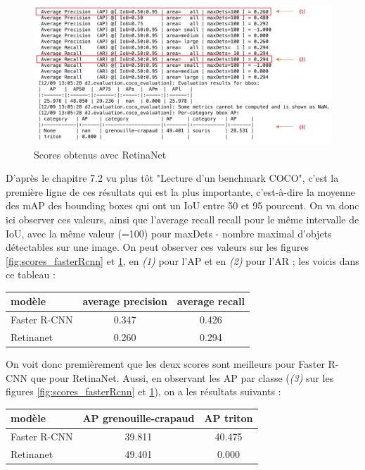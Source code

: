 \begin{figure}[H]
    \centering
    \includegraphics[width=\textwidth]{images/eval_Retinanet_resume_annote.png}
    \caption{Scores obtenus avec RetinaNet}
    \label{fig:scores_retinanet}
\end{figure}

D'après le chapitre 7.2 vu plus tôt "Lecture d'un benchmark COCO", c'est la première ligne de ces résultats qui est la plus importante, c'est-à-dire la moyenne des mAP des bounding boxes qui ont un IoU entre 50 et 95 pourcent. On va donc ici observer ces valeurs, ainsi que l'average recall recall pour le même intervalle de IoU, avec la même valeur (=100) pour maxDets - nombre maximal d'objets détectables sur une image. On peut observer ces valeurs sur les figures \ref{fig:scores_fasterRcnn} et \ref{fig:scores_retinanet}, en \textit{(1)} pour l'AP et en \textit{(2)} pour l'AR ; les voicis dans ce tableau :

\begin{center}
   \begin{tabular}{ | l || c | c |}
     \hline
     modèle & average precision & average recall \\ \hline
     Faster R-CNN & 0.347 & 0.426 \\ \hline
     Retinanet & 0.260 & 0.294 \\ \hline
   \end{tabular}
 \end{center}

On voit donc premièrement que les deux scores sont meilleurs pour Faster R-CNN que pour RetinaNet. Aussi, en observant les AP par classe (\textit{(3)} sur les figures \ref{fig:scores_fasterRcnn} et \ref{fig:scores_retinanet}), on a les résultats suivants : 

\begin{center}
   \begin{tabular}{ | l || c | c |}
     \hline
     modèle & AP grenouille-crapaud & AP triton \\ \hline
     Faster R-CNN & 39.811 & 40.475 \\ \hline
     Retinanet & 49.401 & 0.000 \\ \hline
   \end{tabular}
 \end{center}
 
